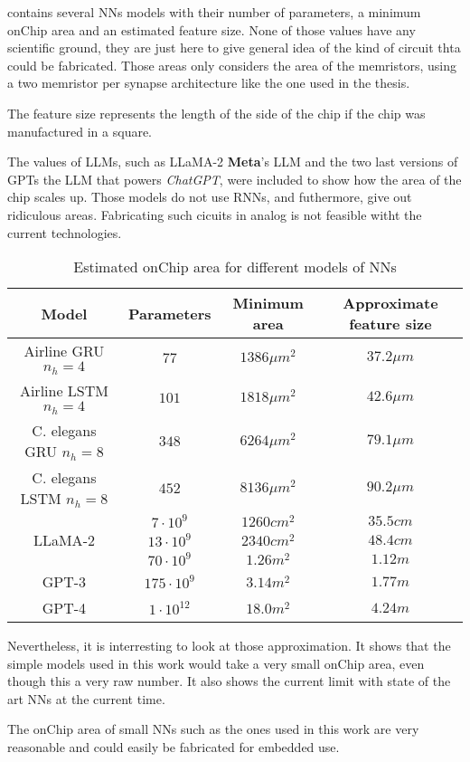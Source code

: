  contains several \acp{NN} models with their number of parameters, a minimum onChip area and an estimated feature size. None of those values have any scientific ground, they are just here to give general idea of the kind of circuit thta could be fabricated. Those areas only considers the area of the memristors, using a two memristor per synapse architecture like the one used in the thesis.

The feature size represents the length of the side of the chip if the chip was manufactured in a square.

The values of \acp{LLM}, such as \ac{LLaMA}-2 \textbf{Meta}'s \ac{LLM} and the two last versions of \acp{GPT} the \ac{LLM} that powers \textit{ChatGPT}, were included to show how the area of the chip scales up. Those models do not use \acp{RNN}, and futhermore, give out ridiculous areas. Fabricating such cicuits in analog is not feasible witht the current technologies.

\begin{table}[H]
  \centering
  \begin{tabular}{|c|c|c|c|}
    \hline
    \rowcolor{gray}
    Model & Parameters & Minimum area & Approximate feature size \\
    \hline
    Airline \ac{GRU} $n_h=4$ & $77$ & $1386\mu m^2$ & $37.2\mu m$\\
    \hline
    Airline \ac{LSTM} $n_h=4$ & $101$ & $1818\mu m^2$ & $42.6\mu m$\\
    \hline
    \ac{C. elegans} \ac{GRU} $n_h=8$ & $348$ & $6264\mu m^2$ & $79.1\mu m$\\
    \hline
    \ac{C. elegans} \ac{LSTM} $n_h=8$ & $452$ & $8136\mu m^2$ & $90.2\mu m$\\
    \hline
    \multirow{3}{*}{\acs{LLaMA}-2} & $7\cdot 10^9$ & $1260 cm^2$ & $35.5 cm$ \\
    \cline{2-4}
    & $13\cdot 10^9$ & $2340 cm^2$ & $48.4 cm$ \\
    \cline{2-4}
    & $70\cdot 10^9$ & $1.26 m^2$ & $1.12 m$ \\
    \hline
    \acs{GPT}-3 & $175\cdot 10^9$ & $3.14 m^2$ & $1.77m$\\
    \hline
    \acs{GPT}-4 & $1\cdot 10^{12}$ & $18.0 m^2$ & $4.24m$\\
    \hline
  \end{tabular}
  \caption{Estimated onChip area for different models of \acp{NN}}
  \label{tab:areas}
\end{table}

Nevertheless, it is interresting to look at those approximation. It shows that the simple models used in this work would take a very small onChip area, even though this a very raw number. It also shows the current limit with state of the art \acp{NN} at the current time.

The onChip area of small \acp{NN} such as the ones used in this work are very reasonable and could easily be fabricated for embedded use.
